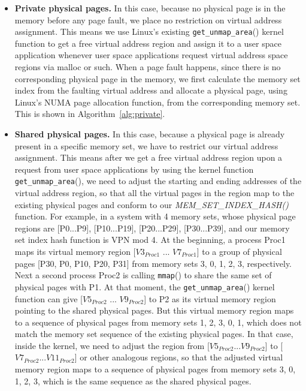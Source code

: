 \begin{itemize}
  \item \textbf{Private physical pages.} In this case, because no
    physical page is in the memory before any page fault, we place no
    restriction on virtual address assignment.  This means we use
    Linux’s existing \verb|get_unmap_area|() kernel function to get a
    free virtual address region and assign it to a user space
    application whenever user space applications request virtual
    address space regions via malloc or such.  When a page fault
    happens, since there is no corresponding physical page in the
    memory, we first calculate the memory set index from the faulting
    virtual address and allocate a physical page, using Linux's NUMA
    page allocation function, from the corresponding memory set. This
    is shown in Algorithm~\ref{alg:private}.
  
  \item \textbf{Shared physical pages.} In this case, because a
    physical page is already present in a specific memory set, we have
    to restrict our virtual address assignment.  This means after we
    get a free virtual address region upon a request from user space
    applications by using the kernel function \verb|get_unmap_area|(),
    we need to adjust the starting and ending addresses of the virtual
    address region, so that all the virtual pages in the region map to
    the existing physical pages and conform to our {\it
      MEM\_SET\_INDEX\_HASH()} function. For example, in a system with
    4 memory sets, whose physical page regions are [P0...P9],
    [P10...P19], [P20...P29], [P30...P39], and our memory set index
    hash function is VPN mod 4.  At the beginning, a process Proc1
    maps its virtual memory region [$V3_{Proc1}$ ... $V7_{Proc1}$] to
    a group of physical pages [P30, P0, P10, P20, P31] from memory
    sets 3, 0, 1, 2, 3, respectively.  Next a second process Proc2 is
    calling \verb|mmap|() to share the same set of physical pages with
    P1. At that moment, the \verb|get_unmap_area|() kernel function
    can give [$V5_{Proc2}$ ... $V9_{Proc2}$] to P2 as its virtual
    memory region pointing to the shared physical pages. But this
    virtual memory region maps to a sequence of physical pages from
    memory sets 1, 2, 3, 0, 1, which does not match the memory set
    sequence of the existing physical pages.  In that case, inside the
    kernel, we need to adjust the region from
    [$V5_{Proc2}...V9_{Proc2}$] to [$V7_{Proc2}...V11_{Proc2}$] or
    other analogous regions, so that the adjusted virtual memory
    region maps to a sequence of physical pages from memory sets 3, 0,
    1, 2, 3, which is the same sequence as the shared physical pages.


\end{itemize}
